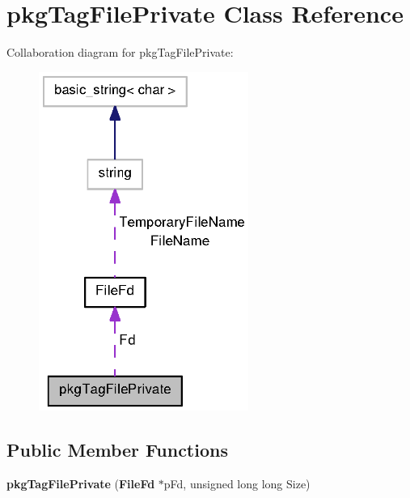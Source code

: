 \section{pkg\-Tag\-File\-Private \-Class \-Reference}
\label{classpkgTagFilePrivate}


\-Collaboration diagram for pkg\-Tag\-File\-Private\-:
\nopagebreak
\begin{figure}[H]
\begin{center}
\leavevmode
\includegraphics[width=194pt]{classpkgTagFilePrivate__coll__graph}
\end{center}
\end{figure}
\subsection*{\-Public \-Member \-Functions}
\begin{DoxyCompactItemize}
\item 
{\bfseries pkg\-Tag\-File\-Private} ({\bf \-File\-Fd} $\ast$p\-Fd, unsigned long long \-Size)\label{classpkgTagFilePrivate_a03957bb10263b00ba8364ea293364655}

\end{DoxyCompactItemize}
